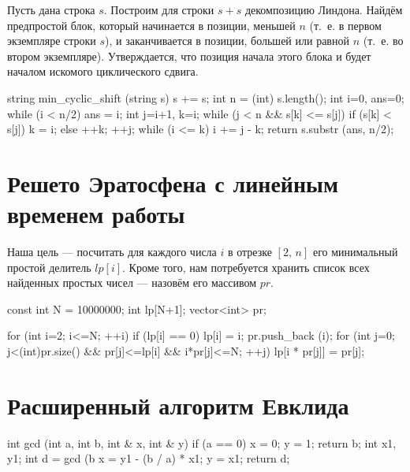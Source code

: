 \documentclass[12pt, titlepage]{article}
\begin{document}
Пусть дана строка $s$. Построим для строки $s+s$ декомпозицию Линдона. Найдём предпростой блок, который начинается в позиции, меньшей $n$ (т.~е. в первом экземпляре строки $s$), и заканчивается в позиции, большей или равной $n$ (т.~е. во втором экземпляре). Утверждается, что позиция начала этого блока и будет началом искомого циклического сдвига.

\begin{cppcode}
string min_cyclic_shift (string s) {
    s += s;
    int n = (int) s.length();
    int i=0, ans=0;
    while (i < n/2) {
        ans = i;
        int j=i+1, k=i;
        while (j < n && s[k] <= s[j]) {
            if (s[k] < s[j])
                k = i;
            else
                ++k;
            ++j;
        }
        while (i <= k)  i += j - k;
    }
    return s.substr (ans, n/2);
}
\end{cppcode}


\section{Решето Эратосфена с линейным временем работы}

Наша цель — посчитать для каждого числа $i$ в отрезке $[2,\,n]$ его минимальный простой делитель $lp[i]$. Кроме того, нам потребуется хранить список всех найденных простых чисел — назовём его массивом $pr$.

\begin{cppcode}
const int N = 10000000;
int lp[N+1];
vector<int> pr;
 
for (int i=2; i<=N; ++i) {
    if (lp[i] == 0) {
        lp[i] = i;
        pr.push_back (i);
    }
    for (int j=0; j<(int)pr.size() && pr[j]<=lp[i] && i*pr[j]<=N; ++j)
        lp[i * pr[j]] = pr[j];
}
\end{cppcode}

\section{Расширенный алгоритм Евклида}

\begin{cppcode}
int gcd (int a, int b, int & x, int & y) {
    if (a == 0) {
        x = 0; y = 1;
        return b;
    }
    int x1, y1;
    int d = gcd (b%
    x = y1 - (b / a) * x1;
    y = x1;
    return d;
}
\end{cppcode}
\end{document}
